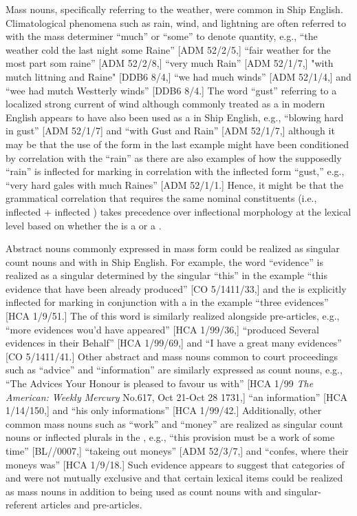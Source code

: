 Mass nouns, specifically referring to the weather, were common in Ship English. Climatological phenomena such as rain, wind, and lightning are often referred to with the mass determiner “much” or “some” to denote quantity, e.g., “the weather cold the last night some Raine” [ADM 52/2/5,] “fair weather for the most part som raine” [ADM 52/2/8,] “very much Rain” [ADM 52/1/7,] "with mutch littning and Raine" [DDB6 8/4,] “we had much winds” [ADM 52/1/4,] and “wee had mutch Westterly winds” [DDB6 8/4.] The word “gust” referring to a localized strong current of wind although commonly treated as a  in modern English appears to have also been used as a  in Ship English, e.g., “blowing hard in gust” [ADM 52/1/7] and “with Gust and Rain” [ADM 52/1/7,] although it may be that the use of the  form in the last example might have been conditioned by correlation with the  “rain” as there are also examples of how the supposedly  “rain” is inflected for  marking in correlation with the inflected form “gust,” e.g., “very hard gales with much Raines” [ADM 52/1/1.] Hence, it might be that the grammatical correlation that requires the same nominal constituents (i.e., inflected  + inflected ) takes precedence over inflectional morphology at the lexical level based on whether the  is a  or a . 

Abstract nouns commonly expressed in mass form could be realized as singular count nouns and with  in Ship English. For example, the word “evidence” is realized as a singular  determined by the singular  “this” in the example “this evidence that have been already produced” [CO 5/1411/33,] and the  is explicitly inflected for  marking in conjunction with a  in the example “three evidences” [HCA 1/9/51.] The  of this word is similarly realized alongside  pre-articles, e.g., “more evidences wou’d have appeared” [HCA 1/99/36,] “produced Several evidences in their Behalf” [HCA 1/99/69,] and “I have a great many evidences” [CO 5/1411/41.] Other abstract and mass nouns common to court proceedings such as “advice” and “information” are similarly expressed as count nouns, e.g., “The Advices Your Honour is pleased to favour us with” [HCA 1/99 \textit{The American: Weekly Mercury} No.617, Oct 21-Oct 28 1731,] “an information” [HCA 1/14/150,] and “his only informations” [HCA 1/99/42.] Additionally, other common mass nouns such as “work” and “money” are realized as singular count nouns or inflected plurals in the , e.g., “this provision must be a work of some time” [BL/\citealt{Egerton2395}/0007,] “takeing out moneys” [ADM 52/3/7,] and “confes, where their moneys was” [HCA 1/9/18.] Such evidence appears to suggest that categories of  and  were not mutually exclusive and that certain lexical items could be realized as  mass nouns in addition to being used as count nouns with  and singular-referent articles and pre-articles. 

